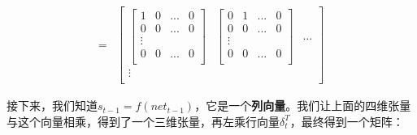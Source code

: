 \begin{align*}
	=                                &
	\begin{bmatrix}
		\begin{bmatrix}
			1 & 0 & ... & 0 \\
			0 & 0 & ... & 0 \\
			\vdots          \\
			0 & 0 & ... & 0 \\
		\end{bmatrix} &
		\begin{bmatrix}
			0 & 1 & ... & 0 \\
			0 & 0 & ... & 0 \\
			\vdots          \\
			0 & 0 & ... & 0 \\
		\end{bmatrix} & ... \\
		\vdots                           \\
	\end{bmatrix}
\end{align*}


接下来，我们知道\(s_{t-1}=f({{net}_{t-1}})\)，它是一个\textbf{列向量}。我们让上面的四维张量与这个向量相乘，得到了一个三维张量，再左乘行向量\(\delta_t^T\)，最终得到一个矩阵：

